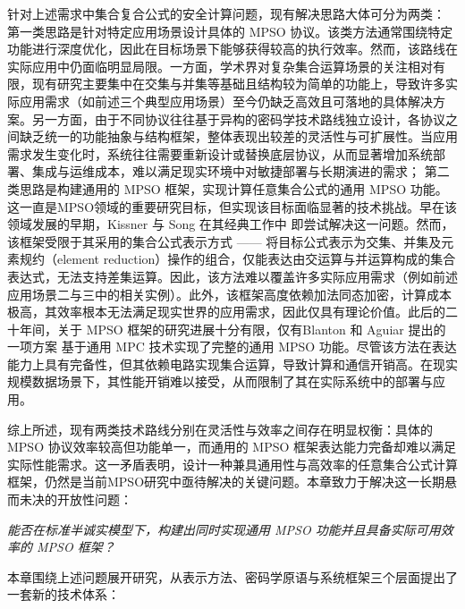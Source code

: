针对上述需求中集合复合公式的安全计算问题，现有解决思路大体可分为两类：
第一类思路是针对特定应用场景设计具体的 MPSO 协议。该类方法通常围绕特定功能进行深度优化，因此在目标场景下能够获得较高的执行效率。然而，该路线在实际应用中仍面临明显局限。一方面，学术界对复杂集合运算场景的关注相对有限，现有研究主要集中在交集与并集等基础且结构较为简单的功能上，导致许多实际应用需求（如前述三个典型应用场景）至今仍缺乏高效且可落地的具体解决方案。另一方面，由于不同协议往往基于异构的密码学技术路线独立设计，各协议之间缺乏统一的功能抽象与结构框架，整体表现出较差的灵活性与可扩展性。当应用需求发生变化时，系统往往需要重新设计或替换底层协议，从而显著增加系统部署、集成与运维成本，难以满足现实环境中对敏捷部署与长期演进的需求；
第二类思路是构建通用的 MPSO 框架，实现计算任意集合公式的通用 MPSO 功能。这一直是MPSO领域的重要研究目标，但实现该目标面临显著的技术挑战。早在该领域发展的早期，Kissner 与 Song 在其经典工作中 \cite{KS-CRYPTO-2005} 即尝试解决这一问题。然而，该框架受限于其采用的集合公式表示方式 —— 将目标公式表示为交集、并集及元素规约（element reduction）操作的组合，仅能表达由交运算与并运算构成的集合表达式，无法支持差集运算。因此，该方法难以覆盖许多实际应用需求（例如前述应用场景二与三中的相关实例）。此外，该框架高度依赖加法同态加密，计算成本极高，其效率根本无法满足现实世界的应用需求，因此仅具有理论价值。此后的二十年间，关于 MPSO 框架的研究进展十分有限，仅有Blanton 和 Aguiar 提出的一项方案 \cite{BA-ASIACCS-2012} 基于通用 MPC 技术实现了完整的通用 MPSO 功能。尽管该方法在表达能力上具有完备性，但其依赖电路实现集合运算，导致计算和通信开销高。在现实规模数据场景下，其性能开销难以接受，从而限制了其在实际系统中的部署与应用。

综上所述，现有两类技术路线分别在灵活性与效率之间存在明显权衡：具体的 MPSO 协议效率较高但功能单一，而通用的 MPSO 框架表达能力完备却难以满足实际性能需求。这一矛盾表明，设计一种兼具通用性与高效率的任意集合公式计算框架，仍然是当前MPSO研究中亟待解决的关键问题。本章致力于解决这一长期悬而未决的开放性问题：
\begin{center}
\emph{能否在标准半诚实模型下，构建出同时实现通用 MPSO 功能并且具备实际可用效率的 MPSO 框架？}
\end{center}

本章围绕上述问题展开研究，从表示方法、密码学原语与系统框架三个层面提出了一套新的技术体系：

